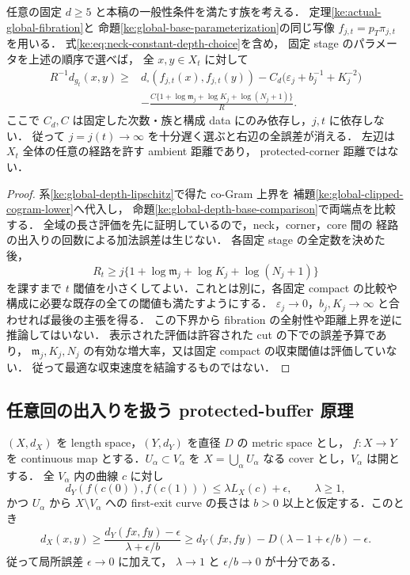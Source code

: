 \begin{theorem}
\label{ke:global-ambient-lower}
任意の固定 $d\ge5$ と本稿の一般性条件を満たす族を考える．
定理\ref{ke:actual-global-fibration}と
命題\ref{ke:global-base-parameterization}の同じ写像
$f_{j,t}=p_T\pi_{j,t}$ を用いる．
式\eqref{ke:eq:neck-constant-depth-choice}を含め，
固定 stage のパラメータを上述の順序で選べば，
全 $x,y\in X_t$ に対して
\begin{equation}\label{ke:eq:global-ambient-lower}
\begin{split}
 R^{-1}d_{g_t}(x,y)\ge {}&
 d_\square(f_{j,t}(x),f_{j,t}(y))
 -C_d\bigl(\varepsilon_j+b_j^{-1}+K_j^{-2}\bigr)\\
 &-\frac{C\{1+\log\mathfrak m_j+\log K_j+\log(N_j+1)\}}R .
\end{split}
\end{equation}
ここで $C_d,C$ は固定した次数・族と構成 data にのみ依存し，$j,t$ に依存しない．
従って $j=j(t)\to\infty$ を十分遅く選ぶと右辺の全誤差が消える．
左辺は $X_t$ 全体の任意の経路を許す ambient 距離であり，
protected-corner 距離ではない．
\end{theorem}

\begin{proof}
系\ref{ke:global-depth-lipschitz}で得た co-Gram 上界を
補題\ref{ke:global-clipped-cogram-lower}へ代入し，
命題\ref{ke:global-depth-base-comparison}で両端点を比較する．
全域の長さ評価を先に証明しているので，neck，corner，core 間の
経路の出入りの回数による加法誤差は生じない．
各固定 stage の全定数を決めた後，
\[
 R_t\ge j\{1+\log\mathfrak m_j+\log K_j+\log(N_j+1)\}
\]
を課すまで $t$ 閾値を小さくしてよい．これとは別に，各固定 compact の比較や
構成に必要な既存の全ての閾値も満たすようにする．
$\varepsilon_j\to0$，$b_j,K_j\to\infty$ と合わせれば最後の主張を得る．
この下界から fibration の全射性や距離上界を逆に推論してはいない．
表示された評価は許容された cut の下での誤差予算であり，
$\mathfrak m_j,K_j,N_j$ の有効な増大率，又は固定 compact の収束閾値は評価していない．
従って最適な収束速度を結論するものではない．
\end{proof}

\subsection{任意回の出入りを扱う protected-buffer 原理}

\begin{lemma}[加法誤差を持つ局所下界の正しい大域化]
\label{ke:buffered-local-lower-globalization}
$(X,d_X)$ を length space，$(Y,d_Y)$ を直径 $D$ の metric space とし，
$f:X\to Y$ を continuous map とする．$U_\alpha\subset V_\alpha$ を
$X=\bigcup_\alpha U_\alpha$ なる cover とし，$V_\alpha$ は開とする．
全 $V_\alpha$ 内の曲線 $c$ に対し
\[
 d_Y(f(c(0)),f(c(1)))\le\lambda L_X(c)+\epsilon,
 \qquad \lambda\ge1,
\]
かつ $U_\alpha$ から $X\setminus V_\alpha$ への first-exit curve の長さは
$b>0$ 以上と仮定する．このとき
\[
 d_X(x,y)\ge
 \frac{d_Y(fx,fy)-\epsilon}{\lambda+\epsilon/b}
 \ge d_Y(fx,fy)-D(\lambda-1+\epsilon/b)-\epsilon.
\]
従って局所誤差 $\epsilon\to0$ に加えて，
$\lambda\to1$ と $\epsilon/b\to0$ が十分である．
\end{lemma}

